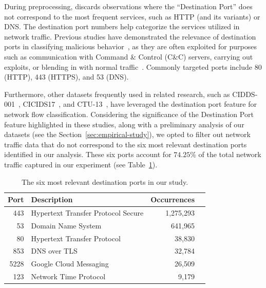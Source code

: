 

During preprocessing, \droidxpflow discards observations where the ``Destination Port'' does not correspond to the most frequent services,
such as HTTP (and its variants) or DNS. The destination port numbers help categorize the services utilized in network traffic.
Previous studies have demonstrated the relevance of destination ports in classifying malicious behavior~\cite{DBLP:journals/compsec/UmerSB17,DBLP:journals/comsur/SperottoSSMPS10},
as they are often exploited for {\color{red}purposes such as communication with Command \& Control (C\&C) servers, carrying out exploits,
or blending in with normal traffic~\cite{DBLP:journals/comsur/SperottoSSMPS10}}. Commonly targeted ports include 80 (HTTP), 443 (HTTPS), and 53 (DNS).

Furthermore, other datasets frequently used in related research, such as CIDDS-001~\cite{Ring2017FlowbasedBD}, CICIDS17~\cite{DBLP:conf/icict/MahfouzVS19},
and CTU-13~\cite{DBLP:journals/compsec/GarciaGSZ14}, have leveraged the destination port feature for network flow classification.
Considering the significance of the Destination Port feature highlighted in these studies, along with a preliminary analysis of our datasets
(see the Section~\ref{sec:empirical-study}), we opted to filter out network traffic data that do not correspond to the six most
relevant destination ports identified in our analysis. These six ports account for $74.25\%$ of the total network traffic captured in our experiment
(see Table~\ref{tab:port}).

\begin{table}[h]
\centering
\caption{The six most relevant destination ports in our study.}
\begin{small}
\begin{tabular}{rlrl} 
\hline
Port & Description & Occurrences \\ 
\hline
443 & Hypertext Transfer Protocol Secure & 1,275,293 \\ 
53 & Domain Name System & 641,965 \\ 
80 & Hypertext Transfer Protocol & 38,830 \\ 
853 & DNS over TLS & 32,784 \\ 
5228 & Google Cloud Messaging & 26,509 \\ 
123 & Network Time Protocol & 9,179 \\ 
\hline
\end{tabular}
\end{small}
\label{tab:port}
\end{table}

